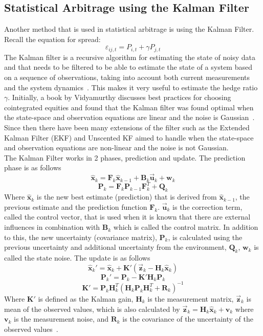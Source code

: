 \subsection{Statistical Arbitrage using the Kalman Filter}
Another method that is used in statistical arbitrage is using the Kalman Filter. Recall the equation for spread:
$$\varepsilon_{i j,t} = P_{i,t} + \gamma P_{j,t}$$
\noindent The Kalman filter is a recursive algorithm for estimating the state of noisy data and that needs to be filtered to be able to estimate the state of a system based on a sequence of observations, taking into account both current measurements and the system dynamics~\cite{ALSADIK2019299}. This makes it very useful to estimate the hedge ratio $\gamma$. Initially, a book by Vidyamurthy discusses best practices for choosing cointegrated equities and found that the Kalman filter was found optimal when the state-space and observation equations are linear and the noise is Gaussian~\cite{vidyamurthy2004pairs}. Since then there have been many extensions of the filter such as the Extended Kalman Filter (EKF) and Unscented KF aimed to handle when the state-space and observation equations are non-linear and the noise is not Gaussian.
\\[5mm]
The Kalman Filter works in 2 phases, prediction and update. The prediction phase is as follows $$\hat{\mathbf{x}}_k = \mathbf{F}_k \hat{\mathbf{x}}_{k-1} + \mathbf{B}_k \overset{\rightarrow}{\mathbf{u}}_k + \mathbf{w}_k$$ $$\mathbf{P}_k = \mathbf{F}_k \mathbf{P}_{k-1} \mathbf{F}_k^T + \mathbf{Q}_k $$ Where $\hat{\mathbf{x}}_k$ is the new best estimate (prediction) that is derived from $\hat{\mathbf{x}}_{k-1}$, the previous estimate and the prediction function $\mathbf{F}_k$. $\overset{\rightarrow}{\mathbf{u}}_k$ is the correction term, called the control vector, that is used when it is known that there are external influences in combination with $\mathbf{B}_k$ which is called the control matrix. In addition to this, the new uncertainty (covariance matrix), $\mathbf{P}_k$, is calculated using the previous uncertainty and additional uncertainty from the environment, $\mathbf{Q}_k $, $\mathbf{w}_k$ is called the state noise. The update is as follows $$\hat{\mathbf{x}}_k' = \hat{\mathbf{x}}_k + \mathbf{K}'(\overset{\rightarrow}{\mathbf{z}}_k - \mathbf{H}_k \hat{\mathbf{x}}_k)$$ $$\mathbf{P}_k' = \mathbf{P}_k - \mathbf{K}'\mathbf{H}_k \mathbf{P}_k$$ $$\mathbf{K}' = \mathbf{P}_k \mathbf{H}_k^T (\mathbf{H}_k \mathbf{P}_k \mathbf{H}_k^T + \mathbf{R}_k)^{-1}$$ Where $\mathbf{K}'$ is defined as the Kalman gain, $\mathbf{H}_k$ is the measurement matrix, $\overset{\rightarrow}{\mathbf{z}}_k$ is mean of the observed values, which is also calculated by $\overset{\rightarrow}{\mathbf{z}}_k = \mathbf{H}_k \hat{\mathbf{x}}_k + \mathbf{v}_k$ where $\mathbf{v}_k$ is the measurement noise, and $\mathbf{R}_k$ is the covariance of the uncertainty of the observed values~\cite{kalman_filter_bzarg}.
